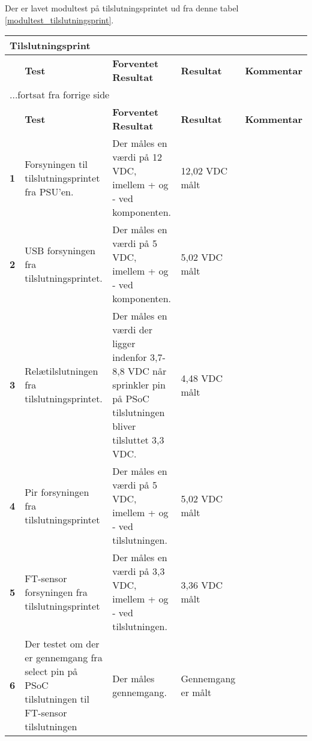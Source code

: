 Der er lavet modultest på tilslutningsprintet ud fra denne tabel \ref{modultest_tilslutningsprint}.

\begin{center}
\begin{longtable}{|p{}|p{}|p{}|p{}|p{}|} %
\hline
\multicolumn{5}{|l|}{\textbf{Tilslutningsprint}} \\ \hline
\multicolumn{1}{|c|}{} &
\textbf{Test} &
\textbf{Forventet \newline Resultat} &
\textbf{Resultat} &
\textbf{Kommentar} \\ \hline 
\endfirsthead

\multicolumn{5}{l}{...fortsat fra forrige side} \\ \hline 
\multicolumn{1}{|c|}{} &
\textbf{Test} &
\textbf{Forventet \newline Resultat} &
\textbf{Resultat} &
\textbf{Kommentar} \\ \hline 
\endhead

\textbf{1}	&Forsyningen til tilslutningsprintet fra PSU'en.
			&Der måles en værdi på 12 VDC, imellem + og - ved komponenten.
			& 12,02 VDC målt
			& \\ \hline 
			
\textbf{2}	&USB forsyningen fra tilslutningsprintet.
			&Der måles en værdi på 5 VDC,  imellem + og - ved komponenten.
			& 5,02 VDC målt
			& \\ \hline 
			
\textbf{3}	&Relætilslutningen fra tilslutningsprintet.
			&Der måles en værdi der ligger indenfor 3,7-8,8 VDC når sprinkler pin på PSoC tilslutningen bliver tilsluttet 3,3 VDC. 
			&4,48 VDC målt
			& \\ \hline 
			
\textbf{4}	&Pir forsyningen fra tilslutningsprintet
			&Der måles en værdi på 5 VDC, imellem + og - ved tilslutningen.
			&5,02 VDC målt
			& \\ \hline 
			
\textbf{5}	&FT-sensor forsyningen fra tilslutningsprintet
			&Der måles en værdi på 3,3 VDC, imellem + og - ved tilslutningen.
			& 3,36 VDC målt
			& \\ \hline 						
			
\textbf{6}	&Der testet om der er gennemgang fra select pin på PSoC tilslutningen til FT-sensor tilslutningen
			&Der måles gennemgang.
			& Gennemgang er målt
			& \\ \hline 
			

\end{longtable}
\end{center}
